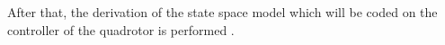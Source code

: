 \documentclass{thesisreport}
\begin{document}
After that, the derivation of the state space model which will be coded on the controller of the quadrotor is performed \cite{Bouabdalla2007}.

\end{document}
